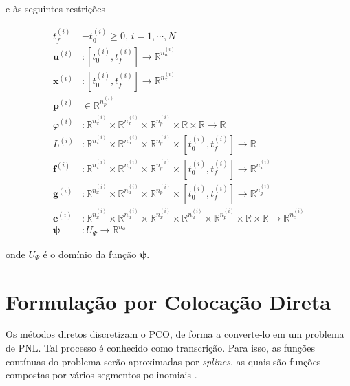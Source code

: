 \noindent e às seguintes restrições

\begin{equation}
\begin{aligned}
    t_f^{(i)} &- t_0^{(i)} \geq 0, \, i = 1, \cdots, N \\
    \mathbf{u}^{(i)} &: \left[ t_0^{(i)}, t_f^{(i)} \right] \rightarrow \mathbb{R}^{n_u^{(i)}} \\
    \mathbf{x}^{(i)} &: \left[ t_0^{(i)}, t_f^{(i)} \right] \rightarrow \mathbb{R}^{n_x^{(i)}} \\
    \mathbf{p}^{(i)} &\in \mathbb{R}^{n_p^{(i)}} \\
    \varphi^{(i)} &: \mathbb{R}^{n_x^{(i)}} \times \mathbb{R}^{n_x^{(i)}} \times \mathbb{R}^{n_p^{(i)}} \times \mathbb{R} \times \mathbb{R} \rightarrow \mathbb{R} \\
    L^{(i)} &: \mathbb{R}^{n_x^{(i)}} \times \mathbb{R}^{n_u^{(i)}} \times \mathbb{R}^{n_p^{(i)}} \times \left[ t_0^{(i)}, t_f^{(i)} \right] \rightarrow \mathbb{R} \\
    \mathbf{f}^{(i)} &: \mathbb{R}^{n_x^{(i)}} \times \mathbb{R}^{n_u^{(i)}} \times \mathbb{R}^{n_p^{(i)}} \times \left[ t_0^{(i)}, t_f^{(i)} \right] \rightarrow \mathbb{R}^{n_x^{(i)}} \\
    \mathbf{g}^{(i)} &: \mathbb{R}^{n_x^{(i)}} \times \mathbb{R}^{n_u^{(i)}} \times \mathbb{R}^{n_p^{(i)}} \times \left[ t_0^{(i)}, t_f^{(i)} \right] \rightarrow \mathbb{R}^{n_g^{(i)}} \\
    \mathbf{e}^{(i)} &: \mathbb{R}^{n_x^{(i)}} \times \mathbb{R}^{n_u^{(i)}} \times \mathbb{R}^{n_x^{(i)}} \times \mathbb{R}^{n_u^{(i)}} \times \mathbb{R}^{n_p^{(i)}} \times \mathbb{R} \times \mathbb{R} \rightarrow \mathbb{R}^{n_e^{(i)}} \\
    \boldsymbol{\psi} &: U_{\Psi} \rightarrow \mathbb{R}^{n_{\Psi}}
\end{aligned}
\end{equation}

\noindent onde $U_{\Psi}$ é o domínio da função $\boldsymbol{\psi}$.

\section{Formulação por Colocação Direta}
\label{sec:formulação-coloc-direta}

Os métodos diretos discretizam o PCO, de forma a converte-lo em um problema de PNL. Tal processo é conhecido como transcrição. Para isso, as funções contínuas do problema serão aproximadas por \textit{splines}, as quais são funções compostas por vários segmentos polinomiais \cite{kelly_introduction_2017}.

